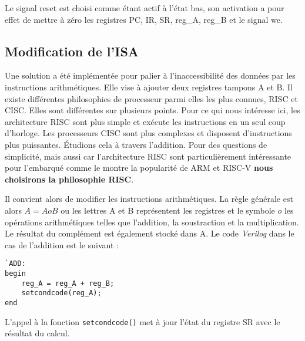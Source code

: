 Le signal reset est choisi comme étant actif à l'état bas, son activation a pour effet de mettre à zéro les registres PC, IR, SR, reg\_A, reg\_B et le signal we.

\subsection{Modification de l'ISA}
Une solution a été implémentée pour palier à l'inaccessibilité des données par les instructions arithmétiques.
Elle vise à ajouter deux registres tampons A et B.
Il existe différentes philosophies de processeur parmi elles les plus connues, \gls{RISC} et \gls{CISC}.
Elles sont différentes sur plusieurs points. Pour ce qui nous intéresse ici, les architecture \gls{RISC} sont plus simple et exécute les instructions en un seul coup d'horloge. Les processeurs \gls{CISC} sont plus complexes et disposent d'instructions plus puissantes. Étudions cela à travers l'addition.
Pour des questions de simplicité, mais aussi car l'architecture \gls{RISC} sont particulièrement intéressante pour l'embarqué comme le montre la popularité de ARM et RISC-V \textbf{nous choisirons la philosophie \gls{RISC}}.

Il convient alors de modifier les instructions arithmétiques. 
La règle générale est alors $A = A o B$ ou les lettres A et B représentent les registres et le symbole $o$ les opérations arithmétiques telles que l'addition, la soustraction et la multiplication. Le résultat du complément est également stocké dans A. 
Le code \textit{Verilog} dans le cas de l'addition est le suivant :
\begin{lstlisting}
`ADD:
begin
    reg_A = reg_A + reg_B;
    setcondcode(reg_A);
end
\end{lstlisting}
L'appel à la fonction \texttt{setcondcode()} met à jour l'état du registre SR avec le résultat du calcul. \\
\gap

